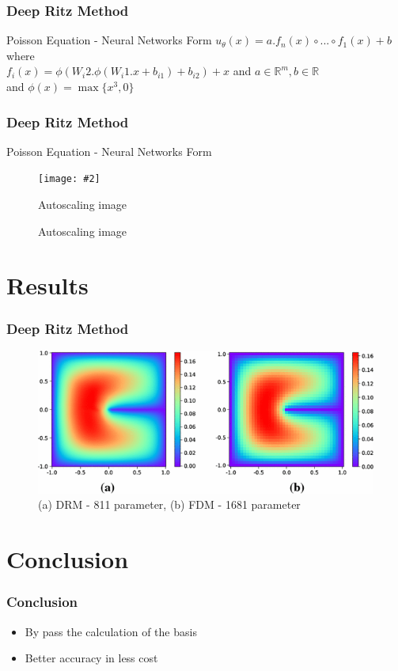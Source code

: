 \documentclass{beamer}
\makeatletter
\newcommand{\R}{\mathbb{R}}
\newcommand{\fitimage}[2][\@nil]{
	\begin{figure}
		\begin{adjustbox}{width=0.9\textwidth, totalheight=\textheight-2\baselineskip-2\baselineskip,keepaspectratio}
			\texttt{[image: \#2]}
		\end{adjustbox}
		\def\tmp{#1}%
		\ifx\tmp\@nnil
		\else
		\caption{#1}
		\fi
	\end{figure}
}
\makeatother
\begin{document}
\begin{frame}
	\frametitle{Deep Ritz Method}
	
	\begin{block}{Poisson Equation - Neural Networks Form}
	$u_{\theta}(x) = a . f_{n}(x) \circ ... \circ f_{1}(x) +b$ \\
	where \\
	$f_{i}(x) = \phi(W_i2 . \phi(W_i1 . x + b_{i1}) + b_{i2}) + x $ and $a \in \R^m, b\in\R $ \\
	and $\phi(x) = \max\{x^3,0\}$
	\end{block}	
\end{frame}

\begin{frame}
	\frametitle{Deep Ritz Method}
	
	\begin{block}{Poisson Equation - Neural Networks Form}
		\fitimage[Autoscaling image]{DRM.png}
	\end{block}	
	
\end{frame}


\section{Results}

\begin{frame}
	\frametitle{Deep Ritz Method}
	\begin{figure}
		\caption{(a) DRM - 811 parameter, (b) FDM - 1681 parameter}
		\includegraphics[width=\textwidth,height=\textheight,keepaspectratio]{DRMvsFDM.png}

	\end{figure}
\end{frame}


\section{Conclusion}
\begin{frame}
	\frametitle{Conclusion}
	\begin{itemize}
		\item <1- > By pass the calculation of the basis
		\item <2- > Better accuracy in less cost
	\end{itemize}
\end{frame}
\end{document}

